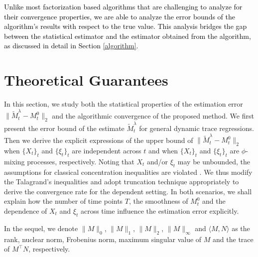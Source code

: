 \documentclass[12pt]{article}
\newcommand{\change}[1]{\textcolor{black}{#1}}
\begin{document}
\change{Unlike most factorization based algorithms that are challenging to analyze for their convergence properties, we are able to analyze the error bounds of the algorithm's results with respect to the true value. This analysis bridges the gap between the statistical estimator and the estimator obtained from the algorithm, as discussed in detail in Section \ref{algorithm}.}
\section{Theoretical Guarantees}
\label{theo}
  In this section, we study both the statistical properties of the estimation error $\|\widetilde{M}_t^\lambda - M_t^0\|_2$ and the algorithmic convergence of the proposed method. We first present the error bound of the estimate $\widetilde{M}_t^\lambda$ for general dynamic trace regressions. Then we derive the explicit expressions of the upper bound of $\|\widetilde{M}_t^\lambda -M_t^0\|_2$ when $\{X_t\}_t$ and $\{\xi_t\}_t$ are independent across $t$ and when $\{X_t\}_t$ and $\{\xi_t\}_t$ are $\phi$-mixing processes, respectively. Noting that $X_t$ and/or $\xi_t$ may be  unbounded, the assumptions for classical concentration inequalities are violated \citep{merlevede2009bernstein, merlevede2011bernstein,hang2017bernstein}. We thus modify the Talagrand's inequalities and adopt  truncation technique appropriately to derive the convergence rate  for the dependent setting.  In both scenarios, we shall explain how the number of time points $T$, the smoothness of $M_t^0$ and the dependence of $X_t$ and $\xi_t$ across time influence the estimation error explicitly. 




  In the sequel, we denote $\|M\|_0$, $\|M\|_1$, $\|M\|_2$, $\|M\|_{\infty}$ and $\langle M,N\rangle$ as the rank, nuclear norm, Frobenius norm, maximum singular value of $M$ and the trace of $M^\top N$, respectively.
\end{document}
